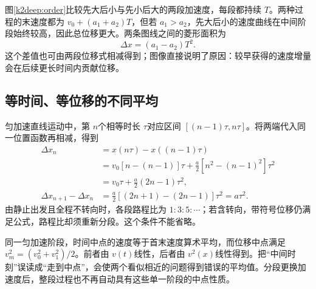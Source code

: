 图\ref{k2deep:order}比较先大后小与先小后大的两段加速度，每段都持续 $T$。两种过程的末速度都为 $v_0+(a_1+a_2)T$，但若 $a_1>a_2$，先大后小的速度曲线在中间阶段始终较高，因此总位移更大。两条图线之间的菱形面积为
\[
 \Delta x=(a_1-a_2)T^2.
\]
这个差值也可由两段位移式相减得到；图像直接说明了原因：较早获得的速度增量会在后续更长时间内贡献位移。


\subsection{等时间、等位移的不同平均}
匀加速直线运动中，第 $n$个相等时长 $\tau$对应区间 $[(n-1)\tau,n\tau]$。将两端代入同一位置函数再相减，得到
\begin{align*}
 \Delta x_n&=x(n\tau)-x((n-1)\tau)\\
 &=v_0[n-(n-1)]\tau+\frac a2[n^2-(n-1)^2]\tau^2\\
 &=v_0\tau+\frac a2(2n-1)\tau^2,\\
 \Delta x_{n+1}-\Delta x_n&=\frac a2[(2n+1)-(2n-1)]\tau^2=a\tau^2.
\end{align*}
由静止出发且全程不转向时，各段路程比为 $1:3:5:\cdots$；若含转向，带符号位移仍满足公式，路程比却须重新分段。这个条件不能省略。

同一匀加速阶段，时间中点的速度等于首末速度算术平均，而位移中点满足 $v_m^2=(v_0^2+v_1^2)/2$。前者由 $v(t)$线性，后者由 $v^2(x)$线性得到。把“中间时刻”误读成“走到中点”，会使两个看似相近的问题得到错误的平均值。分段更换加速度后，整段过程也不再自动具有这些单一阶段的中点性质。


